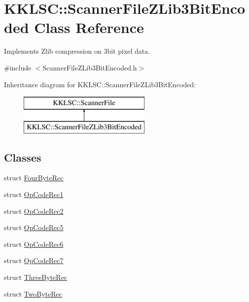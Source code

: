 \hypertarget{class_k_k_l_s_c_1_1_scanner_file_z_lib3_bit_encoded}{}\section{K\+K\+L\+SC\+:\+:Scanner\+File\+Z\+Lib3\+Bit\+Encoded Class Reference}
\label{class_k_k_l_s_c_1_1_scanner_file_z_lib3_bit_encoded}


Implements Zlib compression on 3bit pixel data.  




{\ttfamily \#include $<$Scanner\+File\+Z\+Lib3\+Bit\+Encoded.\+h$>$}

Inheritance diagram for K\+K\+L\+SC\+:\+:Scanner\+File\+Z\+Lib3\+Bit\+Encoded\+:\begin{figure}[H]
\begin{center}
\leavevmode
\includegraphics[height=2.000000cm]{class_k_k_l_s_c_1_1_scanner_file_z_lib3_bit_encoded}
\end{center}
\end{figure}
\subsection*{Classes}
\begin{DoxyCompactItemize}
\item 
struct \hyperlink{struct_scanner_file_z_lib3_bit_encoded_1_1_four_byte_rec}{Four\+Byte\+Rec}
\item 
struct \hyperlink{struct_scanner_file_z_lib3_bit_encoded_1_1_op_code_rec1}{Op\+Code\+Rec1}
\item 
struct \hyperlink{struct_scanner_file_z_lib3_bit_encoded_1_1_op_code_rec2}{Op\+Code\+Rec2}
\item 
struct \hyperlink{struct_scanner_file_z_lib3_bit_encoded_1_1_op_code_rec5}{Op\+Code\+Rec5}
\item 
struct \hyperlink{struct_scanner_file_z_lib3_bit_encoded_1_1_op_code_rec6}{Op\+Code\+Rec6}
\item 
struct \hyperlink{struct_scanner_file_z_lib3_bit_encoded_1_1_op_code_rec7}{Op\+Code\+Rec7}
\item 
struct \hyperlink{struct_scanner_file_z_lib3_bit_encoded_1_1_three_byte_rec}{Three\+Byte\+Rec}
\item 
struct \hyperlink{struct_scanner_file_z_lib3_bit_encoded_1_1_two_byte_rec}{Two\+Byte\+Rec}
\end{DoxyCompactItemize}
